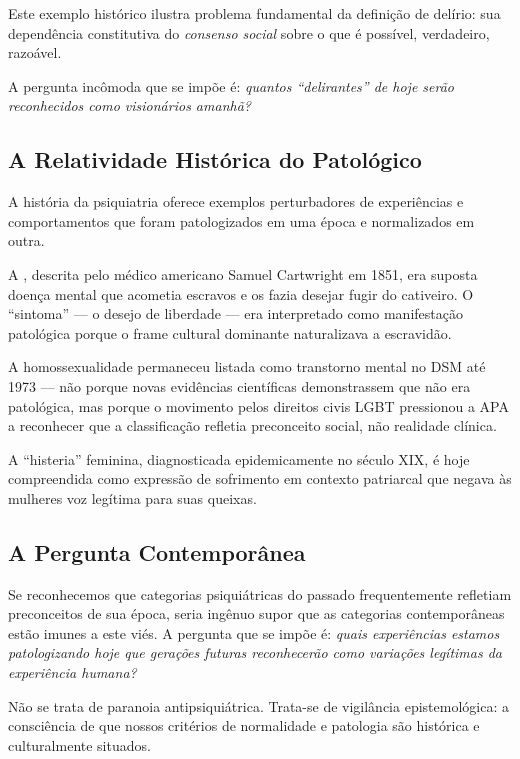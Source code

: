 Este exemplo histórico ilustra problema fundamental da definição de delírio: sua dependência constitutiva do \textit{consenso social} sobre o que é possível, verdadeiro, razoável.

A pergunta incômoda que se impõe é: \textit{quantos \enquote{delirantes} de hoje serão reconhecidos como visionários amanhã?}

\subsection{A Relatividade Histórica do Patológico}

A história da psiquiatria oferece exemplos perturbadores de experiências e comportamentos que foram patologizados em uma época e normalizados em outra.

A , descrita pelo médico americano Samuel Cartwright em 1851, era suposta doença mental que acometia escravos e os fazia desejar fugir do cativeiro. O \enquote{sintoma} --- o desejo de liberdade --- era interpretado como manifestação patológica porque o frame cultural dominante naturalizava a escravidão.

A homossexualidade permaneceu listada como transtorno mental no DSM até 1973 --- não porque novas evidências científicas demonstrassem que não era patológica, mas porque o movimento pelos direitos civis LGBT pressionou a APA a reconhecer que a classificação refletia preconceito social, não realidade clínica.

A \enquote{histeria} feminina, diagnosticada epidemicamente no século XIX, é hoje compreendida como expressão de sofrimento em contexto patriarcal que negava às mulheres voz legítima para suas queixas.

\subsection{A Pergunta Contemporânea}

Se reconhecemos que categorias psiquiátricas do passado frequentemente refletiam preconceitos de sua época, seria ingênuo supor que as categorias contemporâneas estão imunes a este viés. A pergunta que se impõe é: \textit{quais experiências estamos patologizando hoje que gerações futuras reconhecerão como variações legítimas da experiência humana?}

Não se trata de paranoia antipsiquiátrica. Trata-se de vigilância epistemológica: a consciência de que nossos critérios de normalidade e patologia são histórica e culturalmente situados.


